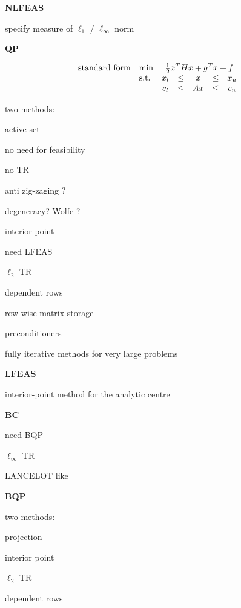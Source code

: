 \documentclass[twoside]{article}
\newcommand{\disp}[1]{\[{#1}\]}
\newcommand{\arr}[2]{\begin{array}{#1}#2\end{array}}
\newcommand{\alist}[2]{\begin{#1}{#2}\end{#1}}
\newcommand{\ilist}[1]{\alist{itemize}{#1}}
\newcommand{\header}[1]{\vspace{5mm}

\noindent
\textbf{\large {#1}}}
\begin{document}
 \header{NLFEAS}


\ilist{
\item
   specify measure of $\ell_{1}$ / $\ell_{\infty}$ norm
}

\header{QP}
   
\disp{\arr{rlccccc}{
   \mbox{standard form}   & \min        
                          & \multicolumn{5}{c}{\frac{1}{2} x^T H x + g^T x + f}
  \\
                          & \mbox{s.t.} & x_l & \leq &    x & \leq & x_u \\
                          &             & c_l & \leq & Ax & \leq & c_u }}


\noindent
   two methods:

\ilist{
   \item  active set
\ilist{
      \item no need for feasibility
      \item no TR
      \item anti zig-zaging ?
      \item degeneracy? Wolfe ?
}
   \item  interior point
\ilist{
      \item need LFEAS
      \item $\ell_2$ TR
      \item dependent rows
}}      

\ilist{
\item
   row-wise matrix storage

\item
   preconditioners

\item
   fully iterative methods for very large problems
}

\header{LFEAS}

\ilist{
\item
   interior-point method for the analytic centre
}

\header{BC}


\ilist{
\item
   need BQP

\item
   $\ell_{\infty}$ TR

\item
   LANCELOT like
}

\header{BQP}


\noindent
   two methods:

\ilist{
 \item projection

 \item interior point
 \ilist{
      \item $\ell_2$ TR
      \item dependent rows
}}
      
\end{document}

